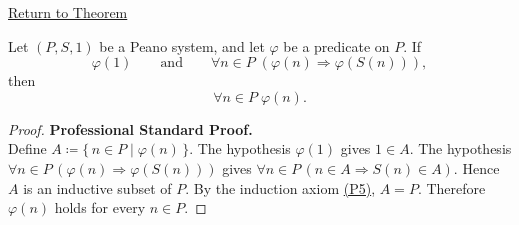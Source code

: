 \newpage
{}
\label{prf:induction-principle-for-peano-system}

\begin{remark*}[Return]
\hyperref[thm:induction-principle-for-peano-system]{Return to Theorem}
\end{remark*}

\begin{theorem*}
Let $(P,S,1)$ be a Peano system, and let $\varphi$ be a predicate on $P$.
If
\[
\varphi(1)
\qquad\text{and}\qquad
\forall n \in P\;(\varphi(n) \Longrightarrow \varphi(S(n))),
\]
then
\[
\forall n \in P\;\varphi(n).
\]
\end{theorem*}

\begin{proof}
\textbf{Professional Standard Proof.}~\\
Define $A \coloneqq \{\,n \in P \mid \varphi(n)\,\}$.
The hypothesis $\varphi(1)$ gives $1 \in A$.
The hypothesis $\forall n \in P\,(\varphi(n) \Rightarrow \varphi(S(n)))$
gives $\forall n \in P\,(n \in A \Rightarrow S(n) \in A)$.
Hence $A$ is an inductive subset of $P$.
By the induction axiom \hyperref[ax:peano-induction]{(P5)}, $A = P$.
Therefore $\varphi(n)$ holds for every $n \in P$.
\end{proof}

